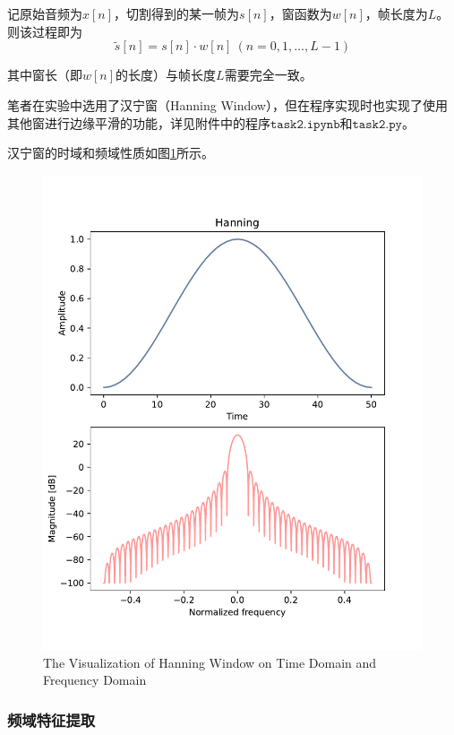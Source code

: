 \documentclass[a4paper]{article}
\begin{document}
    记原始音频为$x[n]$，切割得到的某一帧为$s[n]$，窗函数为$w[n]$，帧长度为$L$。则该过程即为
    \begin{equation*}
        \tilde{s}[n] = s[n]\cdot w[n]\ (n=0,1,...,L-1)
    \end{equation*}
    
    其中窗长（即$w[n]$的长度）与帧长度$L$需要完全一致。
    
    笔者在实验中选用了汉宁窗（Hanning Window），但在程序实现时也实现了使用其他窗进行边缘平滑的功能，详见附件中的程序$\mathtt{task2.ipynb}$和$\mathtt{task2.py}$。
    
    汉宁窗的时域和频域性质如图\ref{fig2}所示。
    
\begin{figure}[htb]
  \includegraphics[scale=0.5]{figs/hanning.pdf}
  \caption{The Visualization of Hanning Window on Time Domain and Frequency Domain}
  \label{fig2}
\end{figure}

\subsubsection{频域特征提取}
\end{document}
